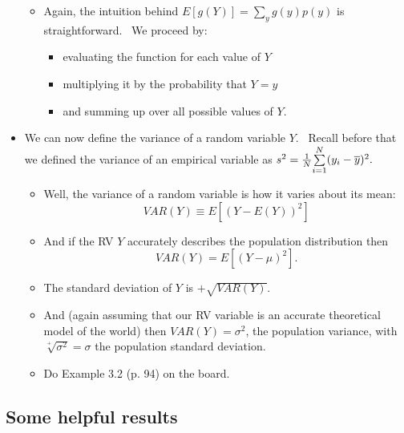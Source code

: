\documentclass[11pt]{article}
\begin{document}
\begin{itemize}
\begin{itemize}
\item Again, the intuition behind $E[g(Y)]=\sum_{y}g(y)p(y)$ is
straightforward. \ We proceed by:

\begin{itemize}
\item evaluating the function for each value of $Y$

\item multiplying it by the probability that $Y=y$

\item and summing up over all possible values of $Y.$
\end{itemize}
\end{itemize}

\item We can now define the variance of a random variable $Y$. \ Recall
before that we defined the variance of an empirical variable as $s^{2}=\frac{%
1}{N}\overset{N}{\underset{i=1}{\sum }}(y_{i}-\overline{y})^{2}.$ \ 

\begin{itemize}
\item Well, the variance of a random variable is how it varies about its
mean:%
\begin{equation*}
VAR(Y)\equiv E[(Y-E\left( Y\right) )^{2}]
\end{equation*}

\item And if the RV $Y$ accurately describes the population distribution then%
\begin{equation*}
VAR(Y)=E[(Y-\mu )^{2}].
\end{equation*}

\item The standard deviation of $Y$ is $+\sqrt{VAR(Y)}.$

\item And (again assuming that our RV variable is an accurate theoretical
model of the world) then $VAR(Y)=\sigma ^{2}$, the population variance, with 
$\sqrt[+]{\sigma ^{2}}=\sigma $ the population standard deviation.

\item Do Example 3.2 (p. 94) on the board.
\end{itemize}
\end{itemize}

\subsection{Some helpful results}
\end{document}
